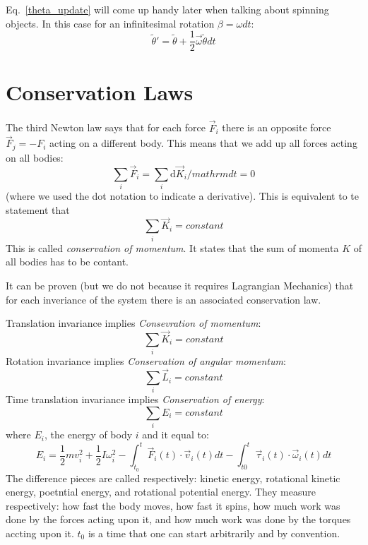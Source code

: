 \documentclass[12pt]{article}
\begin{document}
Eq.~\ref{theta_update} will come up handy later when talking about spinning objects. In this case for an infinitesimal rotation $\beta=\omega dt$:
\begin{equation}
\tilde \theta' = \tilde \theta + \frac{1}{2}\vec \omega \tilde \theta dt
\end{equation}

\section{Conservation Laws}

The third Newton law says that for each force $\vec F_i$ there is an opposite force $\vec F_j = -F_i$ acting on a different body. This means that we add up all forces acting on all bodies:
\begin{equation}
\sum_i \vec F_i = \sum_i \mathrm{d}\vec K_i/mathrm{d}t = 0
\end{equation}
(where we used the dot notation to indicate a derivative). This is equivalent to te statement that
\begin{equation}
\sum_i \vec K_i = constant
\end{equation}
This is called {\it conservation of momentum}. It states that the sum of momenta $K$ of all bodies has to be contant.

It can be proven (but we do not because it requires Lagrangian Mechanics) that for each inveriance of the system there is an associated conservation law.

Translation invariance implies {\it Consevration of momentum}: 
\begin{equation}
\sum_i \vec K_i = constant
\end{equation}
Rotation invariance implies {\it Conservation of angular momentum}:
\begin{equation}
\sum_i \vec L_i = constant
\end{equation}
Time translation invariance implies {\it Conservation of energy}:
\begin{equation}
\sum_i E_i = constant
\end{equation}
where $E_i$, the energy of body $i$ and it equal to:
\begin{equation}
E_i = \frac 12 m v_i^2 + \frac 12 I \omega_i^2 - \int_{t_0}^t \vec F_i(t) \cdot \vec v_i(t) dt
- \int_{t0}^t \vec \tau_i(t) \cdot\vec \omega_i(t) dt
\end{equation}
The difference pieces are called respectively: kinetic energy, rotational kinetic energy, poetntial energy, and rotational potential energy. They measure respectively: how fast the body moves, how fast it spins, how much work was done by the forces acting upon it, and how much work was done by the torques accting upon it. $t_0$ is a time that one can start arbitrarily and by convention.
\end{document}
